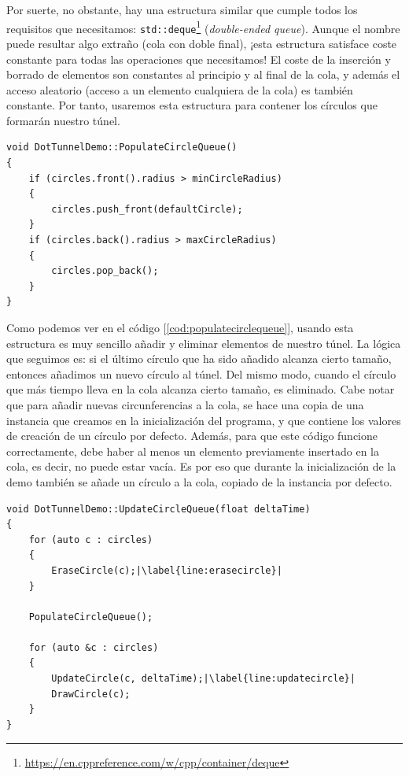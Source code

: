 Por suerte, no obstante, hay una estructura similar que cumple todos los requisitos que necesitamos: \lstinline{std::deque}\footnote{\url{https://en.cppreference.com/w/cpp/container/deque}} (\emph{double-ended queue}). Aunque el nombre puede resultar algo extraño (cola con doble final), ¡esta estructura satisface coste constante para todas las operaciones que necesitamos! El coste de la inserción y borrado de elementos son constantes al principio y al final de la cola, y además el acceso aleatorio (acceso a un elemento cualquiera de la cola) es también constante. Por tanto, usaremos esta estructura para contener los círculos que formarán nuestro túnel.\\

\begin{lstlisting}[style=C-color, caption={Inserción y eliminación de círculos},label=cod:populatecirclequeue]
void DotTunnelDemo::PopulateCircleQueue()
{
    if (circles.front().radius > minCircleRadius)
    {
        circles.push_front(defaultCircle);
    }
    if (circles.back().radius > maxCircleRadius)
    {
        circles.pop_back();
    }
}
\end{lstlisting}

Como podemos ver en el código [\ref{cod:populatecirclequeue}], usando esta estructura es muy sencillo añadir y eliminar elementos de nuestro túnel. La lógica que seguimos es: si el último círculo que ha sido añadido alcanza cierto tamaño, entonces añadimos un nuevo círculo al túnel. Del mismo modo, cuando el círculo que más tiempo lleva en la cola alcanza cierto tamaño, es eliminado. Cabe notar que para añadir nuevas circunferencias a la cola, se hace una copia de una instancia que creamos en la inicialización del programa, y que contiene los valores de creación de un círculo por defecto. Además, para que este código funcione correctamente, debe haber al menos un elemento previamente insertado en la cola, es decir, no puede estar vacía. Es por eso que durante la inicialización de la demo también se añade un círculo a la cola, copiado de la instancia por defecto.\\

\begin{lstlisting}[style=C-color, caption={Actualización del túnel},label=cod:updatecirclequeue,escapechar=|]
void DotTunnelDemo::UpdateCircleQueue(float deltaTime)
{
    for (auto c : circles)
    {
        EraseCircle(c);|\label{line:erasecircle}|
    }

    PopulateCircleQueue();

    for (auto &c : circles)
    {
        UpdateCircle(c, deltaTime);|\label{line:updatecircle}|
        DrawCircle(c);
    }
}
\end{lstlisting}

